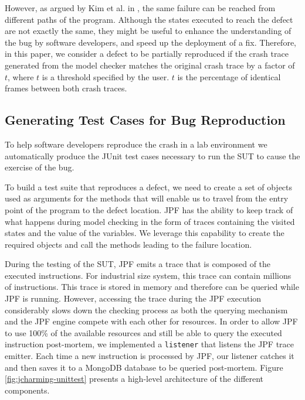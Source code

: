 \documentclass[times]{smrauth}
\begin{document}
However, as argued by Kim et al. in \cite{Kim2013b}, the same failure can
be reached from different paths of the program. Although the
states executed to reach the defect are not exactly the same,
they might be useful to enhance the understanding of the bug
by software developers, and speed up the deployment of a fix.
Therefore, in this paper, we consider a defect to be partially
reproduced if the crash trace generated from the model
checker matches the original crash trace by a factor of $t$, where
$t$ is a threshold specified by the user. $t$ is the percentage of
identical frames between both crash traces.

\subsection{Generating Test Cases for Bug Reproduction}

To help software developers reproduce the crash in a lab
environment we automatically produce the JUnit test cases
necessary to run the SUT to cause the exercise of the bug.

To build a test suite that reproduces a defect, we need to create
a set of objects used as arguments for the methods that will
enable us to travel from the entry point of the program to the
defect location. JPF has the ability to keep track of what
happens during model checking in the form of traces
containing the visited states and the value of the variables. We
leverage this capability to create the required objects and call
the methods leading to the failure location.

During the testing of the SUT, JPF emits a trace that is composed of the executed instructions. 
For industrial size system, this trace can contain millions of instructions. This trace is stored in memory and therefore can be queried while JPF is running. 
However, accessing the trace during the JPF execution considerably slows down the checking process as both the querying mechanism and the JPF engine compete with each other for resources. 
In order to allow JPF to use 100\% of the available resources and still be able to query the executed instruction post-mortem, we implemented a {\tt listener} that listens the JPF trace emitter. 
Each time a new instruction is processed by JPF, our listener catches it and then saves it to a MongoDB database to be queried post-mortem. Figure \ref{fig:jcharming-unittest} presents a high-level architecture of the different components.
\end{document}
